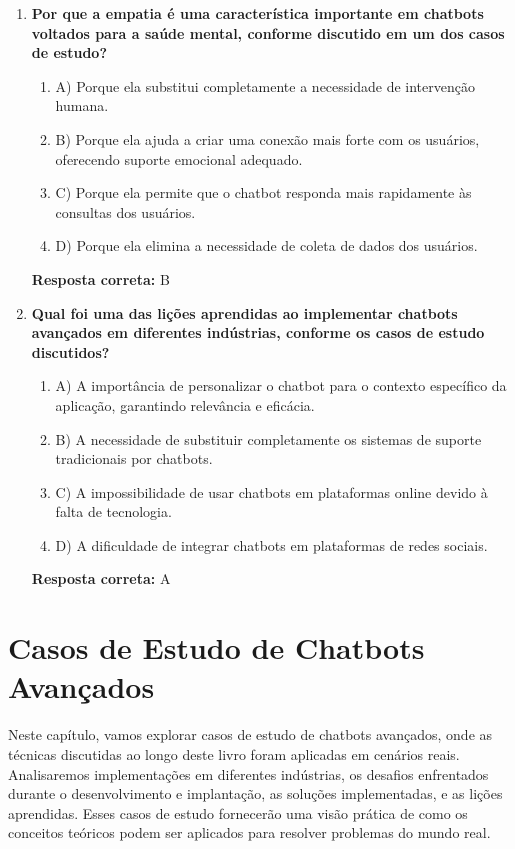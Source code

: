 \documentclass[14pt,a4paper,oneside]{book}
\begin{document}
\begin{enumerate}
	\item \textbf{Por que a empatia é uma característica importante em chatbots voltados para a saúde mental, conforme discutido em um dos casos de estudo?}
	\begin{enumerate}[label=\alph*)]
		\item A) Porque ela substitui completamente a necessidade de intervenção humana.
		\item B) Porque ela ajuda a criar uma conexão mais forte com os usuários, oferecendo suporte emocional adequado.
		\item C) Porque ela permite que o chatbot responda mais rapidamente às consultas dos usuários.
		\item D) Porque ela elimina a necessidade de coleta de dados dos usuários.
	\end{enumerate}
	\vspace{5mm}
	\textbf{Resposta correta:} B
	
	\item \textbf{Qual foi uma das lições aprendidas ao implementar chatbots avançados em diferentes indústrias, conforme os casos de estudo discutidos?}
	\begin{enumerate}[label=\alph*)]
		\item A) A importância de personalizar o chatbot para o contexto específico da aplicação, garantindo relevância e eficácia.
		\item B) A necessidade de substituir completamente os sistemas de suporte tradicionais por chatbots.
		\item C) A impossibilidade de usar chatbots em plataformas online devido à falta de tecnologia.
		\item D) A dificuldade de integrar chatbots em plataformas de redes sociais.
	\end{enumerate}
	\vspace{5mm}
	\textbf{Resposta correta:} A
	
\end{enumerate}


\chapter{Casos de Estudo de Chatbots Avançados}

Neste capítulo, vamos explorar casos de estudo de chatbots avançados, onde as técnicas discutidas ao longo deste livro foram aplicadas em cenários reais. Analisaremos implementações em diferentes indústrias, os desafios enfrentados durante o desenvolvimento e implantação, as soluções implementadas, e as lições aprendidas. Esses casos de estudo fornecerão uma visão prática de como os conceitos teóricos podem ser aplicados para resolver problemas do mundo real.
\end{document}

